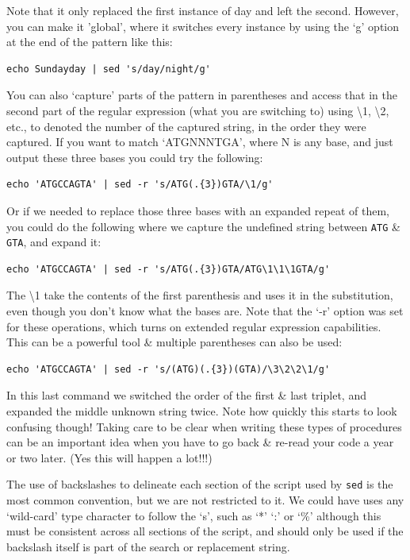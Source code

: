 \documentclass[a4paper,12pt,twoside]{memoir}
\begin{document}
Note that it only replaced the first instance of day and left the second.  
However, you can make it 'global', where it switches every instance by using the `g' option at the end of the pattern like this: \\

\begin{lstlisting}
echo Sundayday | sed 's/day/night/g' 
\end{lstlisting}

You can also `capture' parts of the pattern in parentheses and access that in the second part of the regular expression (what you are switching to) using \textbackslash 1, \textbackslash 2, etc., to denoted the number of the captured string, in the order they were captured.
If you want to match `ATGNNNTGA', where N is any base, and just output these three bases you could try the following:\\
\begin{lstlisting}
echo 'ATGCCAGTA' | sed -r 's/ATG(.{3})GTA/\1/g'
\end{lstlisting}

Or if we needed to replace those three bases with an expanded repeat of them, you could do the following where we capture the undefined string between \texttt{ATG} \& \texttt{GTA}, and expand it: \\
\begin{lstlisting}
echo 'ATGCCAGTA' | sed -r 's/ATG(.{3})GTA/ATG\1\1\1GTA/g'
\end{lstlisting}

The \textbackslash 1 take the contents of the first parenthesis and uses it in the substitution, even though you don't know what the bases are.
Note that the `-r' option was set for these operations, which turns on extended regular expression capabilities.
This can be a powerful tool \& multiple parentheses can also be used: \\
\begin{lstlisting}
echo 'ATGCCAGTA' | sed -r 's/(ATG)(.{3})(GTA)/\3\2\2\1/g'
\end{lstlisting}

In this last command we switched the order of the first \& last triplet, and expanded the middle unknown string twice.
Note how quickly this starts to look confusing though!
Taking care to be clear when writing these types of procedures can be an important idea when you have to go back \& re-read your code a year or two later.
(Yes this will happen a lot!!!)

\begin{information}
The use of backslashes to delineate each section of the script used by \texttt{sed} is the most common convention, but we are not restricted to it.
We could have uses any `wild-card' type character to follow the `s', such as `*' `:' or `\%' although this must be consistent across all sections of the script, and should only be used if the backslash itself is part of the search or replacement string.
\end{information}
\end{document}
